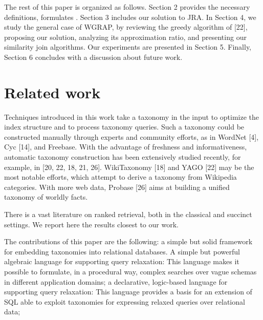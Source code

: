 \documentclass{sig-alternate}
\begin{document}
\smallskip

The rest of this paper is organized as follows. Section 2
provides the necessary definitions, formulates . Section
3 includes our solution to JRA. In Section 4, we study
the general case of WGRAP, by reviewing the greedy algorithm
of [22], proposing our solution, analyzing its approximation
ratio, and presenting our similarity join algorithms.
Our experiments are presented in Section 5. Finally,
Section 6 concludes with a discussion about future work.


\section{Related work} \label{sec:relatedwork}

Techniques introduced in this work take a taxonomy in the
input to optimize the index structure and to process taxonomy
queries. Such a taxonomy could be constructed manually
through experts and community efforts, as in WordNet
[4], Cyc [14], and Freebase. With the advantage of freshness
and informativeness, automatic taxonomy construction has
been extensively studied recently, for example, in [20, 22,
18, 21, 26]. WikiTaxonomy [18] and YAGO [22] may be the
most notable efforts, which attempt to derive a taxonomy
from Wikipedia categories. With more web data, Probase
[26] aims at building a unified taxonomy of worldly facts.

There is a vast literature on ranked retrieval, both in the
classical and succinct settings. We report here the results
closest to our work.


 The contributions of this paper \cite{journals/vldb/MartinenghiT14}   are the following: a simple but solid framework for embedding taxonomies
into relational databases. A simple but powerful algebraic language for supporting
query relaxation: This language makes it possible to formulate, in a procedural way, complex searches over vague schemas in different application domains; a declarative, logic-based language for supporting query
relaxation: This language provides a basis for an extension
of SQL able to exploit taxonomies for expressing relaxed
queries over relational data;
\end{document}
